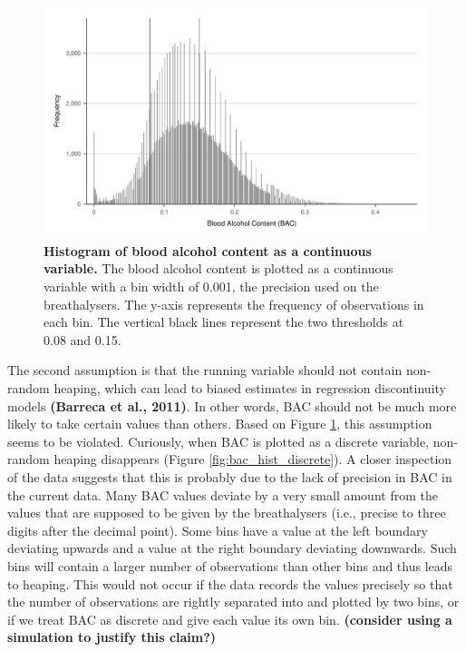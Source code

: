 \documentclass[
  11pt,
]{article}
\begin{document}
\begin{figure}[h]
  \centering
  \includegraphics[width=0.9\columnwidth]{../figures/bac_histogram_continuous.pdf}
  \caption{\textbf{Histogram of blood alcohol content as a continuous variable.} The blood alcohol content is plotted as a continuous variable with a bin width of 0.001, the precision used on the breathalysers. The y-axis represents the frequency of observations in each bin. The vertical black lines represent the two thresholds at 0.08 and 0.15.}
  \label{fig:bac_hist_continuous}
\end{figure}

The second assumption is that the running variable should not contain
non-random heaping, which can lead to biased estimates in regression
discontinuity models \textbf{(Barreca et al., 2011)}. In other words,
BAC should not be much more likely to take certain values than others.
Based on Figure \ref{fig:bac_hist_continuous}, this assumption seems to
be violated. Curiously, when BAC is plotted as a discrete variable,
non-random heaping disappears (Figure \ref{fig:bac_hist_discrete}). A
closer inspection of the data suggests that this is probably due to the
lack of precision in BAC in the current data. Many BAC values deviate by
a very small amount from the values that are supposed to be given by the
breathalysers (i.e., precise to three digits after the decimal point).
Some bins have a value at the left boundary deviating upwards and a
value at the right boundary deviating downwards. Such bins will contain
a larger number of observations than other bins and thus leads to
heaping. This would not occur if the data records the values precisely
so that the number of observations are rightly separated into and
plotted by two bins, or if we treat BAC as discrete and give each value
its own bin. \textbf{(consider using a simulation to justify this
claim?)}
\end{document}
